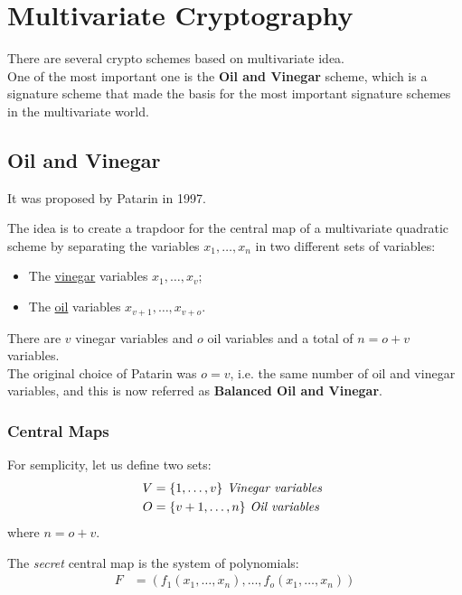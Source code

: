 \section{Multivariate Cryptography}
There are several crypto schemes based on multivariate idea.\\
One of the most important one is the \textbf{Oil and Vinegar} scheme, which is a signature scheme that made the basis for the most important signature schemes in the multivariate world.

\subsection{Oil and Vinegar}
It was proposed by Patarin in 1997.
\medskip

\noindent
The idea is to create a trapdoor for the central map of a
multivariate quadratic scheme by separating the variables $x_1, \ldots, x_n$ in two different sets of variables:
\begin{itemize}
    \item The \underline{vinegar} variables $x_1, \ldots, x_v$;
    \item The \underline{oil} variables $x_{v+1}, \ldots, x_{v+o}$.
\end{itemize}

\noindent
There are $v$ vinegar variables and $o$ oil variables and a total of $n = o + v$
variables.\\
The original choice of Patarin was $o = v$, i.e. the same number of oil and vinegar variables, and this is now referred as \textbf{Balanced Oil and Vinegar}.

\subsubsection{Central Maps}
For semplicity, let us define two sets:
\begin{align*}
    V & = \{1, \ldots, v\} \text{\textit{ Vinegar variables }} \\
    O & = \{v+1, \ldots, n\} \text{\textit{ Oil variables }}
\end{align*}
\noindent
where $n = o + v$.
\medskip

\noindent
The \textit{secret} central map is the system of polynomials:
\begin{align*}
    F & = (f_1(x_1, \ldots, x_n), \ldots, f_o(x_1, \ldots, x_n)) \\
\end{align*}

